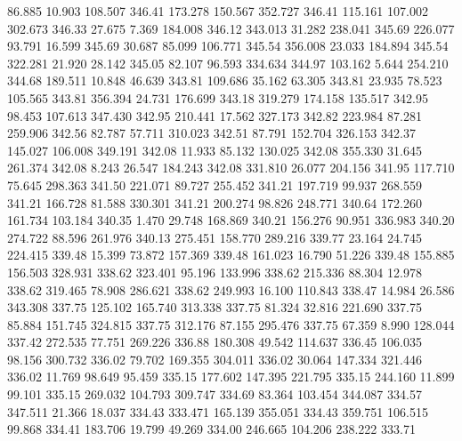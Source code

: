   86.885   10.903  108.507       346.41
 173.278  150.567  352.727       346.41
 115.161  107.002  302.673       346.33
  27.675    7.369  184.008       346.12
 343.013   31.282  238.041       345.69
 226.077   93.791   16.599       345.69
  30.687   85.099  106.771       345.54
 356.008   23.033  184.894       345.54
 322.281   21.920   28.142       345.05
  82.107   96.593  334.634       344.97
 103.162    5.644  254.210       344.68
 189.511   10.848   46.639       343.81
 109.686   35.162   63.305       343.81
  23.935   78.523  105.565       343.81
 356.394   24.731  176.699       343.18
 319.279  174.158  135.517       342.95
  98.453  107.613  347.430       342.95
 210.441   17.562  327.173       342.82
 223.984   87.281  259.906       342.56
  82.787   57.711  310.023       342.51
  87.791  152.704  326.153       342.37
 145.027  106.008  349.191       342.08
  11.933   85.132  130.025       342.08
 355.330   31.645  261.374       342.08
   8.243   26.547  184.243       342.08
 331.810   26.077  204.156       341.95
 117.710   75.645  298.363       341.50
 221.071   89.727  255.452       341.21
 197.719   99.937  268.559       341.21
 166.728   81.588  330.301       341.21
 200.274   98.826  248.771       340.64
 172.260  161.734  103.184       340.35
   1.470   29.748  168.869       340.21
 156.276   90.951  336.983       340.20
 274.722   88.596  261.976       340.13
 275.451  158.770  289.216       339.77
  23.164   24.745  224.415       339.48
  15.399   73.872  157.369       339.48
 161.023   16.790   51.226       339.48
 155.885  156.503  328.931       338.62
 323.401   95.196  133.996       338.62
 215.336   88.304   12.978       338.62
 319.465   78.908  286.621       338.62
 249.993   16.100  110.843       338.47
  14.984   26.586  343.308       337.75
 125.102  165.740  313.338       337.75
  81.324   32.816  221.690       337.75
  85.884  151.745  324.815       337.75
 312.176   87.155  295.476       337.75
  67.359    8.990  128.044       337.42
 272.535   77.751  269.226       336.88
 180.308   49.542  114.637       336.45
 106.035   98.156  300.732       336.02
  79.702  169.355  304.011       336.02
  30.064  147.334  321.446       336.02
  11.769   98.649   95.459       335.15
 177.602  147.395  221.795       335.15
 244.160   11.899   99.101       335.15
 269.032  104.793  309.747       334.69
  83.364  103.454  344.087       334.57
 347.511   21.366   18.037       334.43
 333.471  165.139  355.051       334.43
 359.751  106.515   99.868       334.41
 183.706   19.799   49.269       334.00
 246.665  104.206  238.222       333.71
